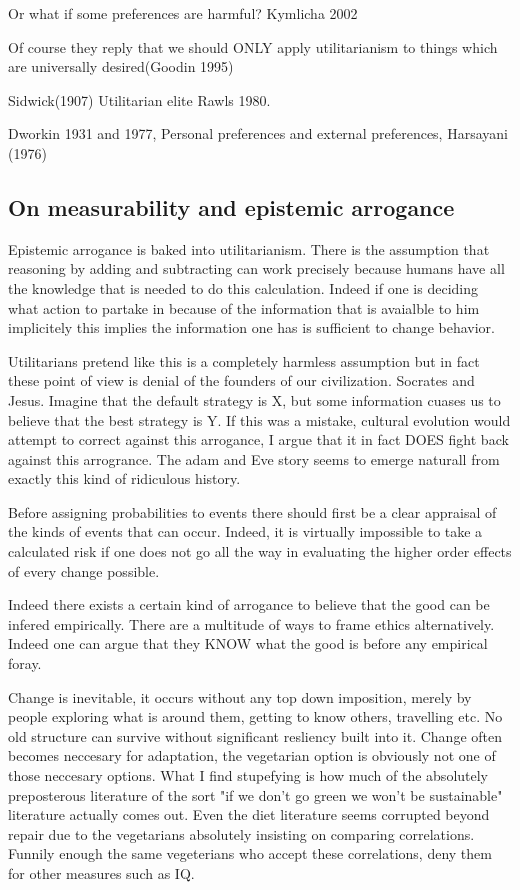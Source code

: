 \documentclass[12pt]{report}
\numberwithin{equation}{section}
\begin{document}
Or what if some preferences are harmful? Kymlicha 2002

Of course they reply that we should ONLY apply utilitarianism to things which are universally desired(Goodin 1995)

Sidwick(1907) Utilitarian elite Rawls 1980. 

Dworkin 1931 and 1977, Personal preferences and external preferences, Harsayani (1976)


\subsection{On measurability and epistemic arrogance}


Epistemic arrogance is baked into utilitarianism. There is the assumption that reasoning by adding and subtracting can work precisely because humans have all the knowledge that is needed to do this calculation. Indeed if one is deciding what action to partake in because of the information that is avaialble to him implicitely this implies the information one has is sufficient to change behavior. 

Utilitarians pretend like this is a completely harmless assumption but in fact these point of view is denial of the founders of our civilization. Socrates and Jesus. Imagine that the default strategy is X, but some information cuases us to believe that the best strategy is Y. If this was a mistake, cultural evolution would attempt to correct against this arrogance, I argue that it in fact DOES fight back against this arrogrance. The adam and Eve story seems to emerge naturall from exactly this kind of ridiculous history. 

Before assigning probabilities to events there should first be a clear appraisal of the kinds of events that can occur. Indeed, it is virtually impossible to take a calculated risk if one does not go all the way in evaluating the higher order effects of every change possible. 

Indeed there exists a certain kind of arrogance to believe that the good can be infered empirically. There are a multitude of ways to frame ethics alternatively. Indeed one can argue that they KNOW what the good is before any empirical foray. 

Change is inevitable, it occurs without any top down imposition, merely by people exploring what is around them, getting to know others, travelling etc. No old structure can survive without significant resliency built into it. Change often becomes neccesary for adaptation, the vegetarian option is obviously not one of those neccesary options. What I find stupefying is how much of the absolutely preposterous literature of the sort "if we don't go green we won't be sustainable"  literature actually comes out. Even the diet literature seems corrupted beyond repair due to the vegetarians absolutely insisting on comparing correlations. Funnily enough the same vegeterians who accept these correlations, deny them for other measures such as IQ. 
\end{document}
